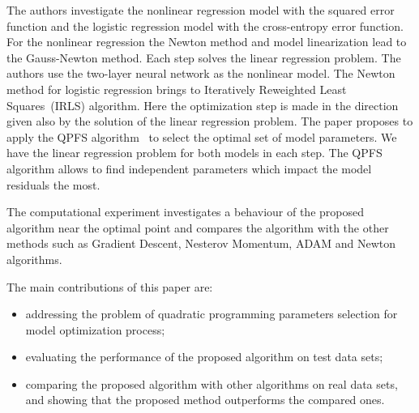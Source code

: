 \documentclass[
11pt,%
tightenlines,%
twoside,%
onecolumn,%
nofloats,%
nobibnotes,%
nofootinbib,%
superscriptaddress,%
noshowpacs,%
centertags]%
{revtex4}
\begin{document}
The authors investigate the nonlinear regression model with the squared error function and the logistic regression model with the cross-entropy error function.
For the nonlinear regression the Newton method and model linearization lead to the Gauss-Newton method. 
Each step solves the linear regression problem. 
The authors use the two-layer neural network as the nonlinear model. 
The Newton method for logistic regression brings to Iteratively Reweighted Least Squares~(IRLS) algorithm. 
Here the optimization step is made in the direction given also by the solution of the linear regression problem.
The paper proposes to apply the QPFS algorithm~\cite{katrutsa2017comprehensive,rodriguez2010qpfs} to select the optimal set of model parameters. We have the linear regression problem for both models in each step. The QPFS algorithm allows to find independent parameters which impact the model residuals the most.

The computational experiment investigates a behaviour of the proposed algorithm near the optimal point and compares the algorithm with the other methods such as Gradient Descent, Nesterov Momentum, ADAM and Newton algorithms. 

The main contributions of this paper are:
\begin{itemize}
	\item addressing the problem of quadratic programming parameters selection for model optimization process; 
	\item evaluating the performance of the proposed algorithm on test data sets;
	\item comparing the proposed algorithm with other algorithms on real data sets, and showing that the proposed method outperforms the compared ones.
\end{itemize}
\end{document}
